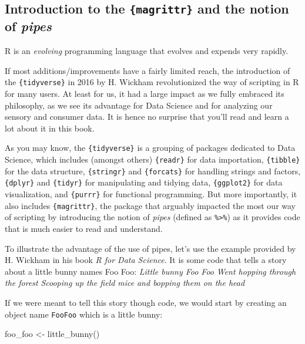 \documentclass[
]{book}
\newenvironment{Shaded}{\begin{snugshade}}{\end{snugshade}}
\newcommand{\FunctionTok}[1]{\textcolor[rgb]{0.00,0.00,0.00}{#1}}
\newcommand{\NormalTok}[1]{#1}
\newcommand{\OtherTok}[1]{\textcolor[rgb]{0.56,0.35,0.01}{#1}}
\begin{document}
\hypertarget{introduction-to-the-magrittr-and-the-notion-of-pipes}{%
\subsection{\texorpdfstring{Introduction to the \texttt{\{magrittr\}} and the notion of \emph{pipes}}{Introduction to the \{magrittr\} and the notion of pipes}}\label{introduction-to-the-magrittr-and-the-notion-of-pipes}}

R is an \emph{evolving} programming language that evolves and expends very rapidly.

If most additions/improvements have a fairly limited reach, the introduction of the \texttt{\{tidyverse\}} in 2016 by H. Wickham revolutionized the way of scripting in R for many users. At least for us, it had a large impact as we fully embraced its philosophy, as we see its advantage for Data Science and for analyzing our sensory and consumer data. It is hence no surprise that you'll read and learn a lot about it in this book.

As you may know, the \texttt{\{tidyverse\}} is a grouping of packages dedicated to Data Science, which includes (amongst others) \texttt{\{readr\}} for data importation, \texttt{\{tibble\}} for the data structure, \texttt{\{stringr\}} and \texttt{\{forcats\}} for handling strings and factors, \texttt{\{dplyr\}} and \texttt{\{tidyr\}} for manipulating and tidying data, \texttt{\{ggplot2\}} for data visualization, and \texttt{\{purrr\}} for functional programming. But more importantly, it also includes \texttt{\{magrittr\}}, the package that arguably impacted the most our way of scripting by introducing the notion of \emph{pipes} (defined as \texttt{\%\textgreater{}\%}) as it provides code that is much easier to read and understand.

To illustrate the advantage of the use of pipes, let's use the example provided by H. Wickham in his book \emph{R for Data Science}.
It is some code that tells a story about a little bunny names Foo Foo:
\emph{Little bunny Foo Foo}
\emph{Went hopping through the forest}
\emph{Scooping up the field mice}
\emph{and bopping them on the head}

If we were meant to tell this story though code, we would start by creating an object name \texttt{FooFoo} which is a little bunny:

\begin{Shaded}
\begin{Highlighting}[]
\NormalTok{foo\_foo }\OtherTok{\textless{}{-}} \FunctionTok{little\_bunny}\NormalTok{()}
\end{Highlighting}
\end{Shaded}
\end{document}
